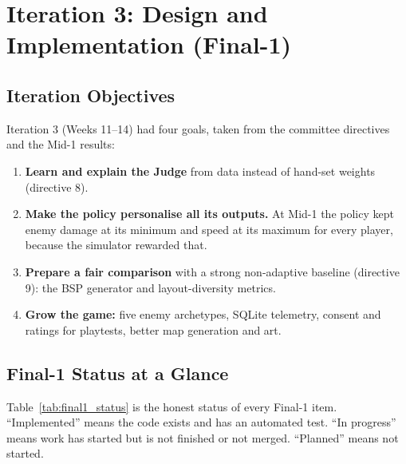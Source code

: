 \chapter{Iteration 3: Design and Implementation (Final-1)}
\label{chap:iter3}

\section{Iteration Objectives}
Iteration 3 (Weeks 11--14) had four goals, taken from the committee directives and the Mid-1 results:
\begin{enumerate}
    \item \textbf{Learn and explain the Judge} from data instead of hand-set weights (directive 8).
    \item \textbf{Make the policy personalise all its outputs.} At Mid-1 the policy kept enemy damage at its minimum and speed at its maximum for every player, because the simulator rewarded that.
    \item \textbf{Prepare a fair comparison} with a strong non-adaptive baseline (directive 9): the BSP generator and layout-diversity metrics.
    \item \textbf{Grow the game:} five enemy archetypes, SQLite telemetry, consent and ratings for playtests, better map generation and art.
\end{enumerate}

\section{Final-1 Status at a Glance}
Table~\ref{tab:final1_status} is the honest status of every Final-1 item. ``Implemented'' means the code exists and has an automated test. ``In progress'' means work has started but is not finished or not merged. ``Planned'' means not started.

